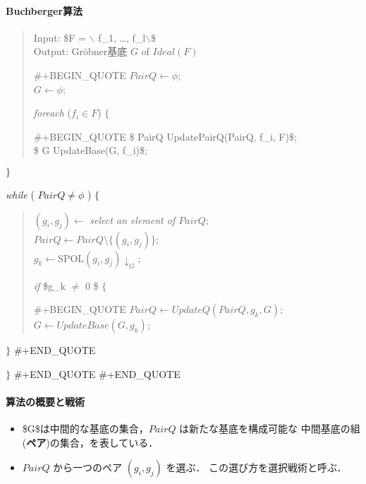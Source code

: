 \documentclass[a4j]{jarticle}
\begin{document}
{\paragraph{Buchberger算法}
\label{sec:orgc515b07}

\begin{quote}
Input: \$F = $\backslash${ f\_1, \ldots, f\_l$\backslash$}\$\\
Output: Gröbner基底 \(G\) of \(Ideal(F)\)

\#+BEGIN\_QUOTE
  \(PairQ \longleftarrow \phi\);\\
  \(G \longleftarrow \phi\);

\emph{foreach} (\(f_i \in F\)) \(\{\)

\#+BEGIN\_QUOTE
  \$ PairQ \longleftarrow UpdatePairQ(PairQ, f\_i, F)\$;\\
  \$ G \longleftarrow UpdateBase(G, f\_i)\$;
\end{quote}

\(\}\)

\emph{while} ( \(PairQ \ne \phi\) ) \(\{\)

\begin{quote}
\((g_i, g_j) \longleftarrow\) \emph{select an element of \(PairQ\)};\\
\(PairQ \longleftarrow PairQ \setminus \{(g_i, g_j)\}\);\\
\(g_k \longleftarrow {{{\mathrm{SPOL}}(g_i, g_j)\!\downarrow_{G}}}\);

\emph{if} \$g\_k \(\ne\) 0 \$ \(\{\)

\#+BEGIN\_QUOTE
  \(PairQ \longleftarrow UpdateQ(PairQ, g_k, G)\);\\
  \(G \longleftarrow UpdateBase(G, g_k)\);
\end{quote}

  \(\}\)
\#+END\_QUOTE

    \(\}\)
  \#+END\_QUOTE
\#+END\_QUOTE

\paragraph{算法の概要と戦術}
\label{sec:orgb1434b2}

\begin{itemize}
\item \$G\$は中間的な基底の集合，\(PairQ\) は新たな基底を構成可能な
中間基底の組 (\textbf{ペア})の集合，を表している．

\item \(PairQ\) から一つのペア \((g_i, g_j)\) を選ぶ．
この選び方を選択戦術と呼ぶ．


\end{itemize}}
\end{document}
